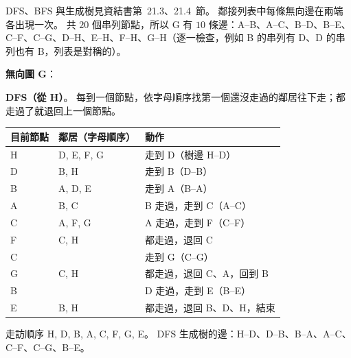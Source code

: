 \begin{pastsoln}
DFS、BFS 與生成樹見資結書第~21.3、21.4~節。 鄰接列表中每條無向邊在兩端各出現一次。 共 $20$ 個串列節點，所以 G 有 $10$ 條邊：A–B、A–C、B–D、B–E、
C–F、C–G、D–H、E–H、F–H、G–H（逐一檢查，例如 B 的串列有 D、D 的串列也有 B，列表是對稱的）。

\textbf{無向圖 G}：
\begin{center}
\end{center}

\textbf{DFS（從 H）}。 每到一個節點，依字母順序找第一個還沒走過的鄰居往下走；都走過了就退回上一個節點。
\begin{center}
\small
\begin{tabular}{lll}
\toprule
目前節點 & 鄰居（字母順序） & 動作 \\
\midrule
H & D, E, F, G & 走到 D（樹邊 H–D） \\
D & B, H & 走到 B（D–B） \\
B & A, D, E & 走到 A（B–A） \\
A & B, C & B 走過，走到 C（A–C） \\
C & A, F, G & A 走過，走到 F（C–F） \\
F & C, H & 都走過，退回 C \\
C & & 走到 G（C–G） \\
G & C, H & 都走過，退回 C、A，回到 B \\
B & & D 走過，走到 E（B–E） \\
E & B, H & 都走過，退回 B、D、H，結束 \\
\bottomrule
\end{tabular}
\end{center}
走訪順序 H, D, B, A, C, F, G, E。 DFS 生成樹的邊：H–D、D–B、B–A、A–C、C–F、C–G、B–E。


\end{pastsoln}
